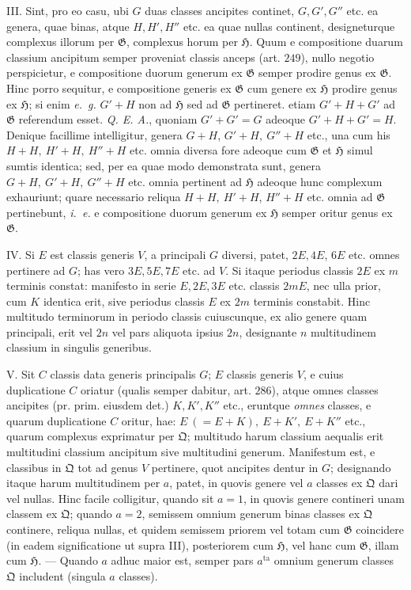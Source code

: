 III. Sint, pro eo casu, ubi \(G\) duas classes ancipites continet, \(G,G',G''\) etc. ea genera, quae binas, atque \(H,H',H''\) etc. ea quae nullas continent, designeturque complexus illorum per \(\mathfrak G\), complexus horum per \(\mathfrak H\). Quum e compositione duarum classium ancipitum semper proveniat classis anceps (art. \(249\)), nullo negotio perspicietur, e compositione duorum generum ex \(\mathfrak G\) semper prodire genus ex \(\mathfrak G\). Hinc porro sequitur, e compositione generis ex \(\mathfrak G\) cum genere ex \(\mathfrak H\) prodire genus ex \(\mathfrak H\); si enim \textit{e.~g.} \(G'+H\) non ad \(\mathfrak H\) sed ad \(\mathfrak G\) pertineret. etiam \(G'+H+G'\) ad \(\mathfrak G\) referendum esset. \textit{Q. E. A.}, quoniam \(G'+G'=G\) adeoque \(G'+H+G'=H\). Denique facillime intelligitur, genera \(G+H\), \(G'+H,\ G''+H\) etc., una cum his \(H+H,\ H'+H,\ H''+H\) etc. omnia diversa fore adeoque cum \(\mathfrak G\) et \(\mathfrak H\) simul sumtis identica; sed, per ea quae modo demonstrata sunt, genera \(G+H,\ G'+H,\ G''+H\) etc. omnia pertinent ad \(\mathfrak H\) adeoque hunc complexum exhauriunt; quare necessario reliqua \(H+H,\ H'+H\), \(H''+H\) etc. omnia ad \(\mathfrak G\) pertinebunt, \textit{i.~e.} e compositione duorum generum ex \(\mathfrak H\) semper oritur genus ex \(\mathfrak G\).

IV. Si \(E\) est classis generis \(V\), a principali \(G\) diversi, patet, \(2E,4E\), \(6E\) etc. omnes pertinere ad \(G\); has vero \(3E,5E,7E\) etc. ad \(V\). Si itaque periodus classis \(2E\) ex \(m\) terminis constat: manifesto in serie \(E,2E,3E\) etc. classis \(2mE\), nec ulla prior, cum \(K\) identica erit, sive periodus classis \(E\) ex \(2m\) terminis constabit. Hinc multitudo terminorum in periodo classis cuiuscunque, ex alio genere quam principali, erit vel \(2n\) vel pars aliquota ipsius \(2n\), designante \(n\) multitudinem classium in singulis generibus.

V. Sit \(C\) classis data generis principalis \(G\); \(E\) classis generis \(V\), e cuius duplicatione \(C\) oriatur (qualis semper dabitur, art. \(286\)), atque omnes classes ancipites (pr. prim. eiusdem det.) \(K,K',K''\) etc., eruntque \textit{omnes} classes, e quarum
duplicatione \(C\) oritur, hae: \(E\ (=E+K),\ E+K',\ E+K''\) etc., quarum complexus exprimatur per \(\mathfrak Q\); multitudo harum classium aequalis erit multitudini classium ancipitum sive multitudini generum. Manifestum est, e classibus in \(\mathfrak Q\) tot ad genus \(V\) pertinere, quot ancipites dentur in \(G\); designando itaque harum multitudinem per \(a\), patet, in quovis genere vel \(a\) classes ex \(\mathfrak Q\) dari vel nullas. Hinc facile colligitur, quando sit \(a=1\), in quovis genere contineri unam classem ex \(\mathfrak Q\); quando \(a=2\), semissem omnium generum binas classes ex \(\mathfrak Q\) continere, reliqua nullas, et quidem semissem priorem vel totam cum \(\mathfrak G\) coincidere (in eadem significatione ut supra III), posteriorem cum \(\mathfrak H\), vel hanc cum \(\mathfrak G\), illam cum \(\mathfrak H\). — Quando \(a\) adhuc maior est, semper pars \(a^{\mathrm{ta}}\) omnium generum classes \(\mathfrak Q\) includent (singula \(a\) classes).

